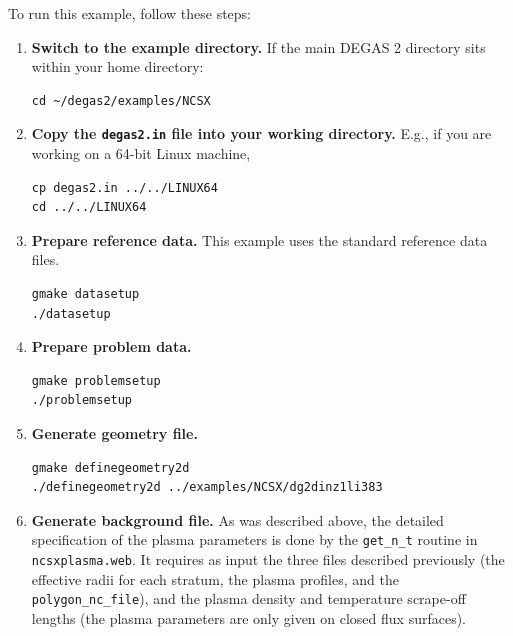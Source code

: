 \documentclass[12pt]{report}
\begin{document}
To run this example, follow these steps:
\begin{enumerate}   
  \item {\bf Switch to the example directory.}  If the main 
DEGAS 2 directory sits
within your home directory:
\begin{verbatim}
cd ~/degas2/examples/NCSX
\end{verbatim}
  \item {\bf Copy the {\tt degas2.in} file into your working directory.}  
E.g., if you are
working on a 64-bit Linux machine,
\begin{verbatim}
cp degas2.in ../../LINUX64
cd ../../LINUX64
\end{verbatim}
  \item {\bf Prepare reference data.}
This example uses the standard reference data files.
\begin{verbatim}
gmake datasetup
./datasetup
\end{verbatim}
  \item {\bf Prepare problem data.}
\begin{verbatim}
gmake problemsetup
./problemsetup
\end{verbatim}
  \item {\bf Generate geometry file.}
\begin{verbatim}
gmake definegeometry2d 
./definegeometry2d ../examples/NCSX/dg2dinz1li383
\end{verbatim}
  \item {\bf Generate background file.} As was described above,
the detailed specification of the plasma parameters is done
by the \verb+get_n_t+ routine in {\tt ncsxplasma.web}.  It requires
as input the three files described previously (the effective radii for
each stratum, the plasma profiles, and the \verb+polygon_nc_file+), 
and the plasma density and temperature scrape-off lengths (the plasma
parameters are only given on closed flux surfaces).


\end{enumerate}
\end{document}
